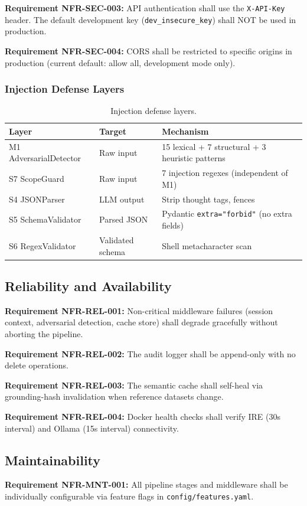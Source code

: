 \documentclass[10pt,journal,onecolumn]{IEEEtran}
\newcommand{\reqid}[1]{\textbf{#1}}
\begin{document}
\reqid{Requirement NFR-SEC-003:} API authentication shall use the \texttt{X-API-Key} header. The default development key (\texttt{dev\_insecure\_key}) shall NOT be used in production.

\reqid{Requirement NFR-SEC-004:} CORS shall be restricted to specific origins in production (current default: allow all, development mode only).

\subsubsection{Injection Defense Layers}
\begin{table}[h]
\caption{Injection defense layers.}
\label{tab:defense}
\begin{tabularx}{\columnwidth}{l >{\raggedright\arraybackslash}p{} X}
\toprule
\textbf{Layer} & \textbf{Target} & \textbf{Mechanism}\\
\midrule
M1 AdversarialDetector & Raw input & 15 lexical + 7 structural + 3 heuristic patterns\\
S7 ScopeGuard & Raw input & 7 injection regexes (independent of M1)\\
S4 JSONParser & LLM output & Strip thought tags, fences\\
S5 SchemaValidator & Parsed JSON & Pydantic \texttt{extra="forbid"} (no extra fields)\\
S6 RegexValidator & Validated schema & Shell metacharacter scan\\
\bottomrule
\end{tabularx}
\end{table}

\subsection{Reliability and Availability}
\reqid{Requirement NFR-REL-001:} Non-critical middleware failures (session context, adversarial detection, cache store) shall degrade gracefully without aborting the pipeline.

\reqid{Requirement NFR-REL-002:} The audit logger shall be append-only with no delete operations.

\reqid{Requirement NFR-REL-003:} The semantic cache shall self-heal via grounding-hash invalidation when reference datasets change.

\reqid{Requirement NFR-REL-004:} Docker health checks shall verify IRE (30s interval) and Ollama (15s interval) connectivity.

\subsection{Maintainability}
\reqid{Requirement NFR-MNT-001:} All pipeline stages and middleware shall be individually configurable via feature flags in \texttt{config/features.yaml}.
\end{document}
